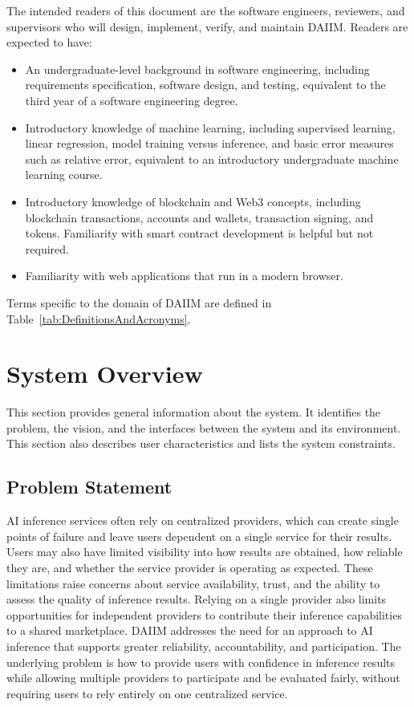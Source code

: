 \documentclass[12pt]{article}
\begin{document}
The intended readers of this document are the software engineers, reviewers, and supervisors who will design, implement, verify, and maintain DAIIM.
Readers are expected to have:
\begin{itemize}
    \item An undergraduate-level background in software engineering, including requirements specification, software design, and testing, equivalent to the third year of a software engineering degree.
    \item Introductory knowledge of machine learning, including supervised learning, linear regression, model training versus inference, and basic error measures such as relative error, equivalent to an introductory undergraduate machine learning course.
    \item Introductory knowledge of blockchain and Web3 concepts, including blockchain transactions, accounts and wallets, transaction signing, and tokens. Familiarity with smart contract development is helpful but not required.
    \item Familiarity with web applications that run in a modern browser.
\end{itemize}
Terms specific to the domain of DAIIM are defined in Table~\ref{tab:DefinitionsAndAcronyms}.

\section{System Overview}

This section provides general information about the system.  It identifies the
problem, the vision, and the interfaces between the system and its environment.
This section also describes user characteristics and lists the system
constraints.

\subsection{Problem Statement}

AI inference services often rely on centralized providers, which can create single points of failure and leave users dependent on a single service for their results. Users may also have limited visibility into how results are obtained, how reliable they are, and whether the service provider is operating as expected.
These limitations raise concerns about service availability, trust, and the ability to assess the quality of inference results. Relying on a single provider also limits opportunities for independent providers to contribute their inference capabilities to a shared marketplace.
DAIIM addresses the need for an approach to AI inference that supports greater reliability, accountability, and participation. The underlying problem is how to provide users with confidence in inference results while allowing multiple providers to participate and be evaluated fairly, without requiring users to rely entirely on one centralized service.
\end{document}
